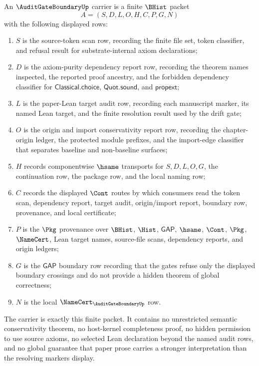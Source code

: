 \begin{definition}
\label{def:audit-gate-boundary-carrier}
An $\AuditGateBoundaryUp$ carrier is a finite $\BHist$ packet
$$
A=(S,D,L,O,H,C,P,G,N)
$$
with the following displayed rows:
\begin{enumerate}
\item $S$ is the source-token scan row, recording the finite file set, token classifier, and refusal result for substrate-internal axiom declarations;
\item $D$ is the axiom-purity dependency report row, recording the theorem names inspected, the reported proof ancestry, and the forbidden dependency classifier for $\mathsf{Classical.choice}$, $\mathsf{Quot.sound}$, and $\mathsf{propext}$;
\item $L$ is the paper-Lean target audit row, recording each manuscript marker, its named Lean target, and the finite resolution result used by the drift gate;
\item $O$ is the origin and import conservativity report row, recording the chapter-origin ledger, the protected module prefixes, and the import-edge classifier that separates baseline and non-baseline surfaces;
\item $H$ records componentwise $\hsame$ transports for $S,D,L,O,G$, the continuation row, the package row, and the local naming row;
\item $C$ records the displayed $\Cont$ routes by which consumers read the token scan, dependency report, target audit, origin/import report, boundary row, provenance, and local certificate;
\item $P$ is the $\Pkg$ provenance over $\BHist$, $\Hist$, $\mathsf{GAP}$, $\hsame$, $\Cont$, $\Pkg$, $\NameCert$, Lean target names, source-file scans, dependency reports, and origin ledgers;
\item $G$ is the $\mathsf{GAP}$ boundary row recording that the gates refuse only the displayed boundary crossings and do not provide a hidden theorem of global correctness;
\item $N$ is the local $\NameCert_{\AuditGateBoundaryUp}$ row.
\end{enumerate}
The carrier is exactly this finite packet. It contains no unrestricted semantic conservativity theorem, no host-kernel completeness proof, no hidden permission to use source axioms, no selected Lean declaration beyond the named audit rows, and no global guarantee that paper prose carries a stronger interpretation than the resolving markers display.
\end{definition}

